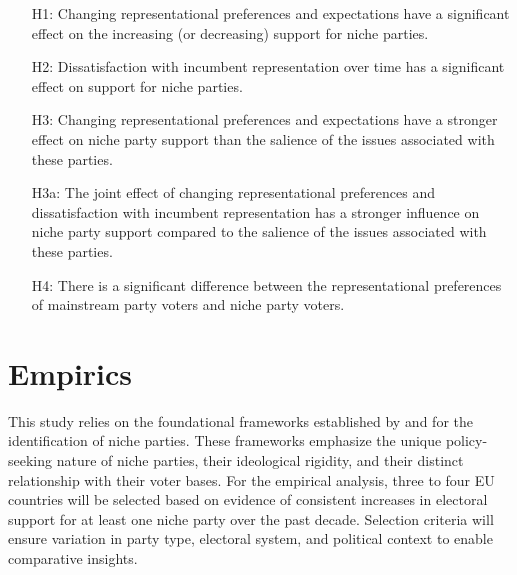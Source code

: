 \begin{itemize}
	\item [H1:] Changing representational preferences and expectations have a significant effect on the increasing (or decreasing) support for niche parties.
	\item [H2:] Dissatisfaction with incumbent representation over time has a significant effect on support for niche parties.
	\item [H3:] Changing representational preferences and expectations have a stronger effect on niche party support than the salience of the issues associated with these parties.
	\item [H3a:] The joint effect of changing representational preferences and dissatisfaction with incumbent representation has a stronger influence on niche party support compared to the salience of the issues associated with these parties.
	\item [H4:] There is a significant difference between the representational preferences of mainstream party voters and niche party voters.
\end{itemize}


\section{Empirics}\label{sec:Empirics} %
This study relies on the foundational frameworks established by \textcite{adams2006} and \textcite{bischof2020} for the identification of niche parties. These frameworks emphasize the unique policy-seeking nature of niche parties, their ideological rigidity, and their distinct relationship with their voter bases. For the empirical analysis, three to four EU countries will be selected based on evidence of consistent increases in electoral support for at least one niche party over the past decade. Selection criteria will ensure variation in party type, electoral system, and political context to enable comparative insights.

